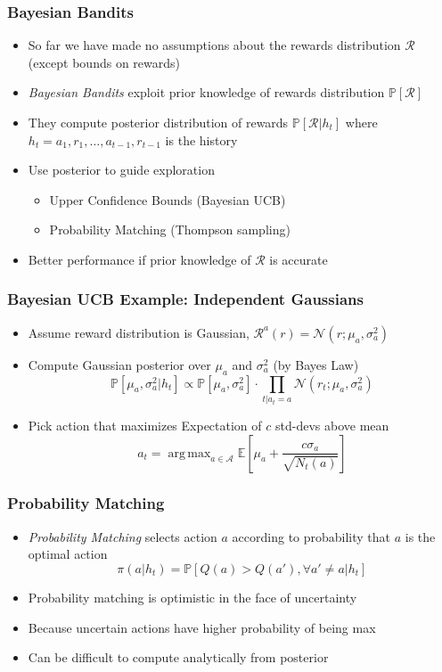\documentclass[handout]{beamer}
\DeclareMathOperator*{\argmax}{arg\,max}
\begin{document}
\begin{frame}
\frametitle{Bayesian Bandits}
\pause
\begin{itemize}
\item So far we have made no assumptions about the rewards distribution $\mathcal{R}$ (except bounds on rewards)
\item {\em Bayesian Bandits} exploit prior knowledge of rewards distribution $\mathbb{P}[\mathcal{R}]$
\item They compute posterior distribution of rewards $\mathbb{P}[\mathcal{R}|h_t]$ where $h_t = a_1,r_1, \ldots, a_{t-1}, r_{t-1}$ is the history
\item Use posterior to guide exploration
\begin{itemize}
\item Upper Confidence Bounds (Bayesian UCB)
\item Probability Matching (Thompson sampling)
\end{itemize}
\item Better performance if prior knowledge of $\mathcal{R}$ is accurate
\end{itemize}
\end{frame}

\begin{frame}
\frametitle{Bayesian UCB Example: Independent Gaussians}
\pause
\begin{itemize}[<+->]
\item Assume reward distribution is Gaussian, $\mathcal{R}^a(r) =\mathcal{N}(r;\mu_a, \sigma_a^2)$
\item Compute Gaussian posterior over $\mu_a$ and $\sigma_a^2$ (by Bayes Law)
$$\mathbb{P}[\mu_a, \sigma_a^2|h_t] \propto \mathbb{P}[\mu_a, \sigma_a^2] \cdot \prod_{t|a_t=a} \mathcal{N}(r_t;\mu_a, \sigma_a^2)$$
\item Pick action that maximizes Expectation of $c$ std-devs above mean
$$a_t = \argmax_{a\in\mathcal{A}} \mathbb{E}[\mu_a + \frac {c \sigma_a} {\sqrt{N_t(a)}}]$$
\end{itemize}
\end{frame}


\begin{frame}
\frametitle{Probability Matching}
\pause
\begin{itemize}[<+->]
\item {\em Probability Matching} selects action $a$ according to probability that $a$ is the optimal action
$$\pi(a|h_t) = \mathbb{P}[Q(a) > Q(a'), \forall a' \neq a | h_t]$$
\item Probability matching is optimistic in the face of uncertainty
\item Because uncertain actions have higher probability of being max
\item Can be difficult to compute analytically from posterior
\end{itemize}
\end{frame}
\end{document}
